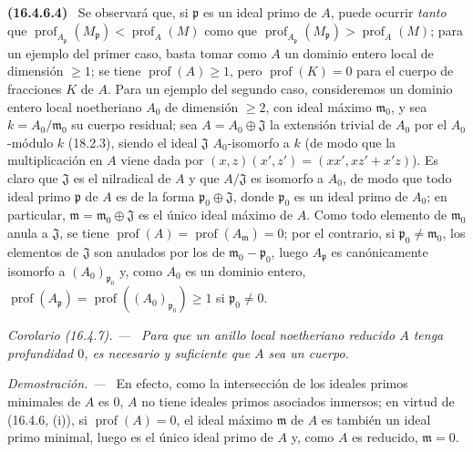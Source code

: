 \documentclass[10pt,oneside]{book}
\makeatletter
\newcommand{\setmanualcurrentlabel}[1]{\def\@currentlabel{#1}}
\newcommand{\oldpage}[2][]{%
  \setcounter{footnote}{0}%
  \marginpar{\scriptsize\textbf{#1}~|~#2}\ignorespaces}
\newenvironment{env}[1][]{\setmanualcurrentlabel{#1}\par\medskip\noindent\textbf{(#1)}\ }{\par}
\newenvironment{corollary}[1][]{%
  \setmanualcurrentlabel{#1}\par\medskip\noindent\itshape Corolario (#1). ---\ }{\par}
\newenvironment{proof}{%
  \par\medskip\noindent\textit{Demostración. ---\ }}{\par}
\providecommand{\setmin}{-}%
\makeatother
\begin{document}
\begin{env}[16.4.6.4]
\label{0.16.4.6.4-es}
Se observará que, si $\mathfrak{p}$ es un ideal primo de $A$, puede ocurrir
\emph{tanto} que
$\operatorname{prof}_{A_{\mathfrak{p}}}(M_{\mathfrak{p}})
<\operatorname{prof}_A(M)$ como que
$\operatorname{prof}_{A_{\mathfrak{p}}}(M_{\mathfrak{p}})
>\operatorname{prof}_A(M)$; para un ejemplo del primer caso,
\oldpage[0\textsubscript{IV-1}]{35}
basta tomar como $A$ un dominio entero local de dimensión $\geq1$; se tiene
$\operatorname{prof}(A)\geq1$, pero $\operatorname{prof}(K)=0$ para el cuerpo
de fracciones $K$ de $A$. Para un ejemplo del segundo caso, consideremos un
dominio entero local noetheriano $A_0$ de dimensión $\geq2$, con ideal máximo
$\mathfrak{m}_0$, y sea $k=A_0/\mathfrak{m}_0$ su cuerpo residual; sea
$A=A_0\oplus\mathfrak{J}$ la extensión trivial de $A_0$ por el $A_0$-módulo
$k$ (18.2.3), siendo el ideal $\mathfrak{J}$ $A_0$-isomorfo a $k$ (de modo que
la multiplicación en $A$ viene dada por
$(x,z)(x',z')=(xx',xz'+x'z)$). Es claro que $\mathfrak{J}$ es el nilradical de
$A$ y que $A/\mathfrak{J}$ es isomorfo a $A_0$, de modo que todo ideal primo
$\mathfrak{p}$ de $A$ es de la forma
$\mathfrak{p}_0\oplus\mathfrak{J}$, donde $\mathfrak{p}_0$ es un ideal primo
de $A_0$; en particular, $\mathfrak{m}=\mathfrak{m}_0\oplus\mathfrak{J}$ es el
único ideal máximo de $A$. Como todo elemento de $\mathfrak{m}_0$ anula a
$\mathfrak{J}$, se tiene
$\operatorname{prof}(A)=\operatorname{prof}(A_{\mathfrak{m}})=0$; por el
contrario, si $\mathfrak{p}_0\neq\mathfrak{m}_0$, los elementos de
$\mathfrak{J}$ son anulados por los de
$\mathfrak m_0\setmin\mathfrak{p}_0$, luego $A_{\mathfrak{p}}$ es canónicamente
isomorfo a $(A_0)_{\mathfrak{p}_0}$ y, como $A_0$ es un dominio entero,
$\operatorname{prof}(A_{\mathfrak{p}})
=\operatorname{prof}((A_0)_{\mathfrak{p}_0})\geq1$ si
$\mathfrak{p}_0\neq0$.
\end{env}

\begin{corollary}[16.4.7]
\label{0.16.4.7-es}
Para que un anillo local noetheriano reducido $A$ tenga profundidad $0$, es
necesario y suficiente que $A$ sea un cuerpo.
\end{corollary}

\begin{proof}
En efecto, como la intersección de los ideales primos minimales de $A$ es $0$,
$A$ no tiene ideales primos asociados inmersos; en virtud de (16.4.6, (i)), si
$\operatorname{prof}(A)=0$, el ideal máximo $\mathfrak{m}$ de $A$ es también
un ideal primo minimal, luego es el único ideal primo de $A$ y, como $A$ es
reducido, $\mathfrak{m}=0$.
\end{proof}
\end{document}
